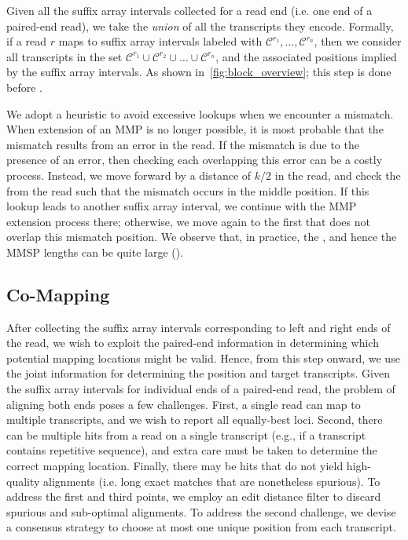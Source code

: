 Given all the suffix array intervals collected for a read end (i.e. one end of a 
paired-end read), we take the \emph{union} of all the transcripts they encode. 
Formally, if  a read $r$ maps to suffix array intervals labeled with $\mathcal{C}^{r_1}, 
\ldots, \mathcal{C}^{r_n}$, then we consider all transcripts in the set $\mathcal{C}^{r_1} 
\cup \mathcal{C}^{r_2} \cup \ldots \cup \mathcal{C}^{r_n}$, and the associated positions 
implied by the suffix array intervals. As shown in~\cref{fig:block_overview}; 
this step is done before \cm.

We adopt a heuristic to avoid excessive \kmer lookups when we encounter a mismatch. 
When extension of an MMP is no longer possible, it is most probable that the mismatch 
results from an error in the read. If the mismatch is due to the presence of an error, 
then checking each \kmer overlapping this error can be a costly process. Instead, 
we move forward by a distance of $k/2$ in the read, and check the \kmer from the read 
such that the mismatch occurs in the middle position. If this \kmer lookup leads to 
another suffix array interval, we continue with the MMP extension process there; 
otherwise, we move again to the first \kmer that does not overlap this mismatch 
position. We observe that, in practice, the \kslcp, and hence the MMSP lengths can 
be quite large ().

\subsection{Co-Mapping}
After collecting the suffix array intervals corresponding to left and right ends of the read, we wish to exploit 
the paired-end information in determining which potential mapping locations might be valid.  Hence, from this step 
onward, we use the joint information for determining the position and target transcripts. Given the suffix array 
intervals for individual ends of a paired-end read, the problem of aligning both ends poses a few challenges. 
First, a single read can map to multiple transcripts, and we wish to report all equally-best loci. Second, there 
can be multiple hits from a read on a single transcript (e.g., if a transcript contains repetitive sequence), and 
extra care must be taken to determine the correct mapping location. Finally, there may be hits that do not yield 
high-quality alignments (i.e. long exact matches that are nonetheless spurious).  To address the first and third 
points, we employ an edit distance filter to discard spurious and sub-optimal alignments.  To address the second 
challenge, we devise a consensus strategy to choose at most one unique position from each transcript.

